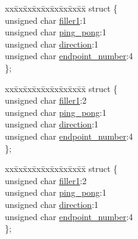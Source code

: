 \begin{DoxyCompactItemize}
\begin{tabbing}
\end{tabbing}\item 
\begin{tabbing}
xx\=xx\=xx\=xx\=xx\=xx\=xx\=xx\=xx\=\kill
struct \{\\
\>unsigned char \hyperlink{union_____u_s_t_a_t_a54acb45d462e0ff47705a7514916273d}{filler1}:1\\
\>unsigned char \hyperlink{union_____u_s_t_a_t_a9ec468b66f0444dc9be4ec11f75a0a5f}{ping\_pong}:1\\
\>unsigned char \hyperlink{union_____u_s_t_a_t_a4c9b82152ef06a9d3b78f60779cd4b85}{direction}:1\\
\>unsigned char \hyperlink{union_____u_s_t_a_t_a4f411fec039d172f03e2a41d46ff58ca}{endpoint\_number}:4\\
\}; \\

\end{tabbing}\item 
\begin{tabbing}
xx\=xx\=xx\=xx\=xx\=xx\=xx\=xx\=xx\=\kill
struct \{\\
\>unsigned char \hyperlink{union_____u_s_t_a_t_a54acb45d462e0ff47705a7514916273d}{filler1}:2\\
\>unsigned char \hyperlink{union_____u_s_t_a_t_a9ec468b66f0444dc9be4ec11f75a0a5f}{ping\_pong}:1\\
\>unsigned char \hyperlink{union_____u_s_t_a_t_a4c9b82152ef06a9d3b78f60779cd4b85}{direction}:1\\
\>unsigned char \hyperlink{union_____u_s_t_a_t_a4f411fec039d172f03e2a41d46ff58ca}{endpoint\_number}:4\\
\}; \\

\end{tabbing}\item 
\begin{tabbing}
xx\=xx\=xx\=xx\=xx\=xx\=xx\=xx\=xx\=\kill
struct \{\\
\>unsigned char \hyperlink{union_____u_s_t_a_t_a54acb45d462e0ff47705a7514916273d}{filler1}:2\\
\>unsigned char \hyperlink{union_____u_s_t_a_t_a9ec468b66f0444dc9be4ec11f75a0a5f}{ping\_pong}:1\\
\>unsigned char \hyperlink{union_____u_s_t_a_t_a4c9b82152ef06a9d3b78f60779cd4b85}{direction}:1\\
\>unsigned char \hyperlink{union_____u_s_t_a_t_a4f411fec039d172f03e2a41d46ff58ca}{endpoint\_number}:4\\
\}; \\


\end{tabbing}
\end{DoxyCompactItemize}
